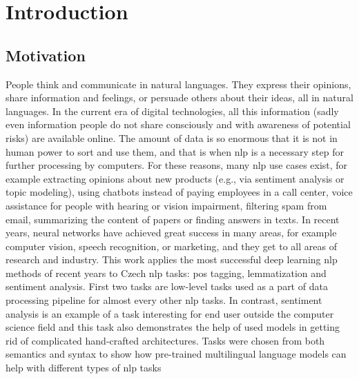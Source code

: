 \chapter*{Introduction}
\section*{Motivation}
People think and communicate in natural languages. They express their opinions, share information and feelings, or persuade others about their ideas, all in natural languages. In the current era of digital technologies, all this information (sadly even information people do not share consciously and with awareness of potential risks) are available online. The amount of data is so enormous that it is not in human power to sort and use them, and that is when \acrfull{nlp} is a necessary step for further processing by computers. For these reasons, many \acrshort{nlp} use cases exist, for example extracting opinions about new products (e.g., via sentiment analysis or topic modeling), using chatbots instead of paying employees in a call center, voice assistance for people with hearing or vision impairment, filtering spam from email, summarizing the content of papers or finding answers in texts. In recent years, neural networks have achieved great success in many areas, for example computer vision, speech recognition, or marketing, and they  get to all areas of research and industry. This work applies the most successful deep learning \acrshort{nlp} methods of recent years to Czech \acrlong{nlp} tasks: \acrfull{pos} tagging, lemmatization and sentiment analysis. First two tasks are low-level tasks used as a part of data processing pipeline for almost every other \acrshort{nlp} tasks. In contrast, sentiment analysis is an example of a task interesting for end user outside the computer science field and this task also demonstrates the help of used models in getting rid of complicated hand-crafted architectures. Tasks were chosen from both semantics and syntax to show how pre-trained multilingual language models can help with different types of \gls{nlp} tasks
